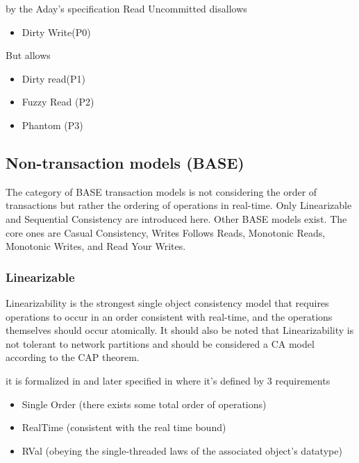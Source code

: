 \documentclass[a4paper,10pt,titlepage]{report}
\begin{document}
by the Aday's specification Read Uncommitted disallows
\begin{itemize}
    \item Dirty Write(P0)
\end{itemize}
But allows
\begin{itemize}
    \item Dirty read(P1)
    \item Fuzzy Read (P2)
    \item Phantom (P3)
\end{itemize}

\subsection{Non-transaction models (BASE)}
The category of BASE transaction models is not considering the order of transactions but rather the ordering of operations in real-time. Only Linearizable and Sequential Consistency are introduced here. Other BASE models exist. The core ones are Casual Consistency, Writes Follows Reads, Monotonic Reads, Monotonic Writes, and Read Your Writes.

\subsubsection{Linearizable}
Linearizability is the strongest single object consistency model that requires operations to occur in an order consistent with real-time, and the operations themselves should occur atomically. It should also be noted that Linearizability is not tolerant to network partitions and should be considered a CA model according to the CAP theorem.

it is formalized  in \cite{Linearizability} and later specified  in \cite{ConsistencyinNonTransactionalDistributedStorageSystems} where it's defined by 3 requirements

\begin{itemize}
    \item Single Order (there exists some total order of operations)
    \item RealTime (consistent with the real time bound)
    \item RVal (obeying the single-threaded laws of the associated object's datatype)
\end{itemize}
\end{document}
